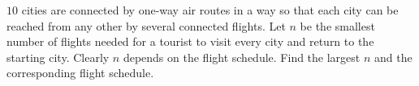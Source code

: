 $10$ cities are connected by one-way air routes in a way so that each city can be reached from any other by several connected flights. Let $n$ be the smallest number of flights needed for a tourist to visit every city and return to the starting city. Clearly $n$ depends on the flight schedule. Find the largest $n$ and the corresponding flight schedule.